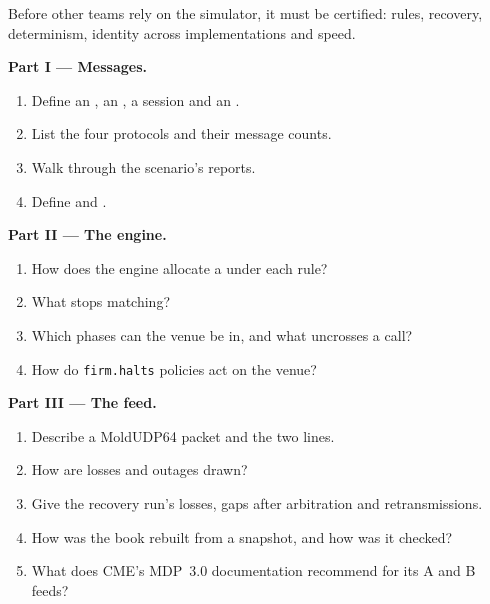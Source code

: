 \begin{problem}\label{pb:mx:build-a-matching-engine-and-exchange-simulator:1}
Before other teams rely on the simulator, it must be certified: rules, recovery, determinism, identity across implementations and speed.

\medskip\noindent\textbf{Part I --- Messages.}
\begin{enumerate}
\item Define an , an , a session and an .
\item List the four protocols and their message counts.
\item Walk through the scenario's reports.
\item Define  and .
\end{enumerate}

\medskip\noindent\textbf{Part II --- The engine.}
\begin{enumerate}[resume]
\item How does the engine allocate a  under each rule?
\item What stops matching?
\item Which phases can the venue be in, and what uncrosses a call?
\item How do \texttt{firm.halts} policies act on the venue?
\end{enumerate}

\medskip\noindent\textbf{Part III --- The feed.}
\begin{enumerate}[resume]
\item Describe a MoldUDP64 packet and the two lines.
\item How are losses and outages drawn?
\item Give the recovery run's losses, gaps after arbitration and retransmissions.
\item How was the book rebuilt from a snapshot, and how was it checked?
\item What does CME's MDP~3.0 documentation recommend for its A and B feeds?
\end{enumerate}


\end{problem}
